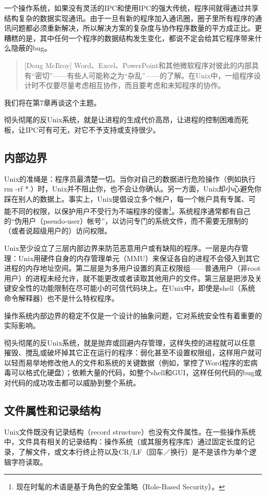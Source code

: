 \documentclass[12pt,oneside]{book}
\begin{document}
一个操作系统，如果没有灵活的IPC和使用IPC的强大传统，程序间就得通过共享结构复杂的数据实现通讯。由于一旦有新的程序加入通讯圈，圈子里所有程序的通讯问题都必须重新解决，所以解决方案的复杂度与协作程序数量的平方成正比。更糟糕的是，其中任何一个程序的数据结构发生变化，都说不定会给其它程序带来什么隐蔽的bug。

\begin{quote}[Doug McIlroy]
Word、Excel、PowerPoint和其他微软程序对彼此的内部具有“密切”——有些人可能称之为“杂乱”——的了解。在Unix中，一组程序设计时不仅要尽量考虑相互协作，而且要考虑和未知程序的协作。
\end{quote}

我们将在第7章再谈这个主题。

彻头彻尾的反Unix系统，就是让进程的生成代价高昂，让进程的控制困难而死板，让IPC可有可无，对它不予支持或支持很少。

\subsection{内部边界}
Unix的准绳是：程序员最清楚一切。当你对自己的数据进行危险操作（例如执行rm -rf *.）时，Unix并不阻止你，也不会让你确认。另一方面，Unix却小心避免你踩在别人的数据上。事实上，Unix提倡设立多个帐户，每一个帐户具有专属、可能不同的权限，以保护用户不受行为不端程序的侵害\footnote{现在时髦的术语是基于角色的安全策略（Role-Based Security）。}。系统程序通常都有自己的“伪用户（pseudo-user）帐号”，以访问专门的系统文件，而不需要无限制的（或者说超级用户的）访问权限。

Unix至少设立了三层内部边界来防范恶意用户或有缺陷的程序。一层是内存管理：Unix用硬件自身的内存管理单元（MMU）来保证各自的进程不会侵入到其它进程的内存地址空间。第二层是为多用户设置的真正权限组——普通用户（非root用户）的进程未经允许，就不能更改或者读取其他用户的文件。第三层是把涉及关键安全性的功能限制在尽可能小的可信代码块上。在Unix中，即使是shell（系统命令解释器）也不是什么特权程序。

操作系统内部边界的稳定不仅是一个设计的抽象问题，它对系统安全性有着重要的实际影响。

彻头彻尾的反Unix系统，就是抛弃或回避内存管理，这样失控的进程就可以任意摧毁、搅乱或破坏掉其它正在运行的程序：弱化甚至不设置权限组，这样用户就可以轻而易举地修改他人的文件和系统的关键数据（例如，掌控了Word程序的宏病毒可以格式化硬盘）；依赖大量的代码，如整个shell和GUI，这样任何代码的bug或对代码的成功攻击都可以威胁到整个系统。

\subsection{文件属性和记录结构}
Unix文件既没有记录结构（record structure）也没有文件属性。在一些操作系统中，文件具有相关的记录结构：操作系统（或其服务程序库）通过固定长度的记录，了解文件，或文本行终止符以及CR/LF（回车／换行）是不是该作为单个逻辑字符读取。
\end{document}
